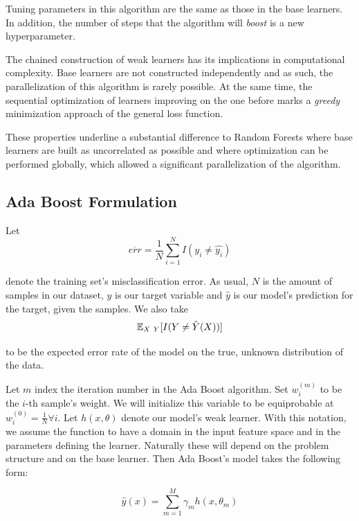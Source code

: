 Tuning parameters in this algorithm are the same as those in the base learners. In addition, the number of steps that the algorithm will \textit{boost} is a new hyperparameter.

The chained construction of weak learners has its implications in computational complexity. Base learners are not constructed independently and as such, the parallelization of this algorithm is rarely possible. At the same time, the sequential optimization of learners improving on the one before marks a \textit{greedy} minimization approach of the general loss function.

These properties underline a substantial difference to Random Forests where base learners are built as uncorrelated as possible and where optimization can be performed globally, which allowed a significant parallelization of the algorithm.

\subsection{Ada Boost Formulation}\label{subsection:gradient_boosting_formulation}

Let
\begin{equation}\label{eq:adaBoostTrainingError}
\overline{err} = \frac{1}{N} \sum_{i=1}^{N} I(y_i \neq \hat{y_i})
\end{equation}

denote the training set's misclassification error. As usual, $N$ is the amount of samples in our dataset, $y$ is our target variable and $\hat{y}$ is our model's prediction for the target, given the samples. We also take
\begin{equation}
\operatorname{\mathbb{E}}_{X \ Y} [ I(Y \neq \hat{Y}(X)) ]
\end{equation}

to be the expected error rate of the model on the true, unknown distribution of the data.

Let $m$ index the iteration number in the Ada Boost algorithm. Set $w^{(m)}_i$ to be the $i$-th sample's weight. We will initialize this variable to be equiprobable at $w^{(0)}_i = \frac{1}{N} \forall i$. Let $h(x,\theta)$ denote our model's weak learner. With this notation, we assume the function to have a domain in the input feature space and in the parameters defining the learner. Naturally these will depend on the problem structure and on the base learner. Then Ada Boost's model takes the following form:

\begin{equation}\label{eq:adaBoostModel}
\hat{y}(x) = \sum_{m=1}^{M} \gamma_m h(x,\theta_m)
\end{equation}

